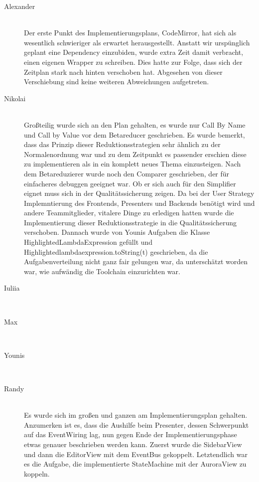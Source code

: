 \documentclass[parskip=full,11pt,twoside]{scrartcl}
\begin{document}
\begin{description}

\item [Alexander]\hfill \\
Der erste Punkt des Implementierungsplans, CodeMirror, hat sich als wesentlich schwieriger als erwartet herausgestellt.
Anstatt wir urspünglich geplant eine Dependency einzubiden, wurde extra Zeit damit verbracht, einen eigenen Wrapper zu schreiben.
Dies hatte zur Folge, dass sich der Zeitplan stark nach hinten verschoben hat.
Abgesehen von dieser Verschiebung sind keine weiteren Abweichungen aufgetreten.
\item [Nikolai]\hfill \\
Großteilig wurde sich an den Plan gehalten, es wurde nur Call By Name und Call by Value vor dem Betareducer geschrieben.
Es wurde  bemerkt, dass das Prinzip dieser Reduktionsstrategien sehr ähnlich zu der Normalenordnung war und zu dem Zeitpunkt es passender erschien diese zu implementieren als in ein komplett neues Thema einzusteigen.
Nach dem Betareduzierer wurde noch den Comparer geschrieben, der für einfacheres debuggen geeignet war. Ob er sich auch für den Simplifier eignet muss sich in der Qualitätssicherung zeigen.
Da bei der User Strategy Implemntierung des Frontends, Presenters und Backends benötigt wird und andere Teammitglieder, vitalere Dinge zu erledigen hatten
wurde die Implementierung dieser Reduktionsstrategie in die Qualitätssicherung verschoben.
Dannach wurde von Younis Aufgaben die Klasse HighlightedLambdaExpression gefüllt und  Highlightedlambdaexpression.toString(t) geschrieben, da die Aufgabenverteilung nicht ganz fair gelungen war, da unterschätzt worden war, wie aufwändig die Toolchain einzurichten war.

\item [Iuliia]\hfill \\
\item [Max]\hfill \\
\item [Younis]\hfill \\
\item [Randy]\hfill \\
Es wurde sich im großen und ganzen am Implementierungsplan gehalten. Anzumerken ist es, dass die Aushilfe beim Presenter, dessen Schwerpunkt auf das EventWiring lag, nun gegen
Ende der Implementierungsphase etwas genauer beschrieben werden kann. Zuerst wurde die SidebarView und dann die EditorView mit dem EventBus gekoppelt.
Letztendlich war es die Aufgabe, die implementierte StateMachine mit der AuroraView zu koppeln.
    
\end{description}
\end{document}
